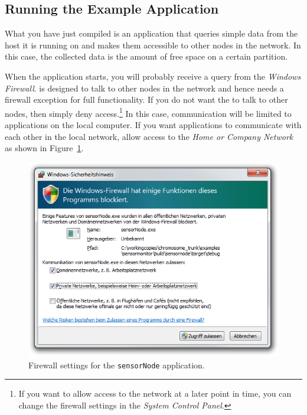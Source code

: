 \subsection{Running the Example Application}
\label{sec:example_sensorMonitor:common}

What you have just compiled is an application that queries simple data from the host it is running on
and makes them accessible to other nodes in the network.
In this case, the collected data is the amount of free space on a certain partition.

When the application starts, you will probably receive a query from the \emph{Windows Firewall}.
\xme is designed to talk to other nodes in the network and hence needs a firewall exception for full functionality.
If you do not want the \xme to talk to other nodes, then simply deny access.\footnote{%
If you want to allow access to the network at a later point in time,
you can change the firewall settings in the \emph{System Control Panel}.}
In this case, communication will be limited to \xme applications on the local computer.
If you want \xme applications to communicate with each other in the local network,
allow access to the \emph{Home or Company Network} as shown in Figure~\ref{fig:firewall_sensorNode}.

\begin{figure}[htpb]
	\centering
	\includegraphics[scale=0.75]{figures/firewall_sensorNode.png}
	\caption{Firewall settings for the \texttt{sensorNode} application.}
	\label{fig:firewall_sensorNode}
\end{figure}

